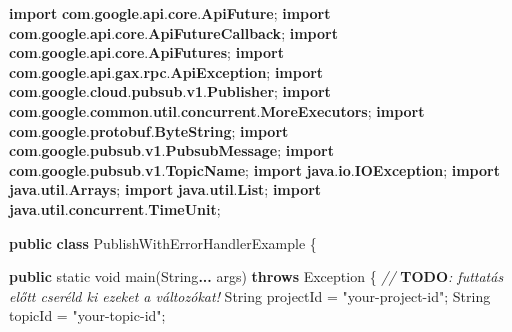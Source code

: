\documentclass[
]{article}
\newenvironment{Shaded}{}{}
\newcommand{\AlertTok}[1]{\textcolor[rgb]{1.00,0.00,0.00}{\textbf{#1}}}
\newcommand{\BuiltInTok}[1]{\textcolor[rgb]{0.00,0.50,0.00}{#1}}
\newcommand{\CommentTok}[1]{\textcolor[rgb]{0.38,0.63,0.69}{\textit{#1}}}
\newcommand{\DataTypeTok}[1]{\textcolor[rgb]{0.56,0.13,0.00}{#1}}
\newcommand{\FunctionTok}[1]{\textcolor[rgb]{0.02,0.16,0.49}{#1}}
\newcommand{\ImportTok}[1]{\textcolor[rgb]{0.00,0.50,0.00}{\textbf{#1}}}
\newcommand{\KeywordTok}[1]{\textcolor[rgb]{0.00,0.44,0.13}{\textbf{#1}}}
\newcommand{\NormalTok}[1]{#1}
\newcommand{\OperatorTok}[1]{\textcolor[rgb]{0.40,0.40,0.40}{#1}}
\newcommand{\StringTok}[1]{\textcolor[rgb]{0.25,0.44,0.63}{#1}}
\begin{document}
\begin{Shaded}
\begin{Highlighting}[]
\KeywordTok{import} \ImportTok{com}\OperatorTok{.}\ImportTok{google}\OperatorTok{.}\ImportTok{api}\OperatorTok{.}\ImportTok{core}\OperatorTok{.}\ImportTok{ApiFuture}\OperatorTok{;}
\KeywordTok{import} \ImportTok{com}\OperatorTok{.}\ImportTok{google}\OperatorTok{.}\ImportTok{api}\OperatorTok{.}\ImportTok{core}\OperatorTok{.}\ImportTok{ApiFutureCallback}\OperatorTok{;}
\KeywordTok{import} \ImportTok{com}\OperatorTok{.}\ImportTok{google}\OperatorTok{.}\ImportTok{api}\OperatorTok{.}\ImportTok{core}\OperatorTok{.}\ImportTok{ApiFutures}\OperatorTok{;}
\KeywordTok{import} \ImportTok{com}\OperatorTok{.}\ImportTok{google}\OperatorTok{.}\ImportTok{api}\OperatorTok{.}\ImportTok{gax}\OperatorTok{.}\ImportTok{rpc}\OperatorTok{.}\ImportTok{ApiException}\OperatorTok{;}
\KeywordTok{import} \ImportTok{com}\OperatorTok{.}\ImportTok{google}\OperatorTok{.}\ImportTok{cloud}\OperatorTok{.}\ImportTok{pubsub}\OperatorTok{.}\ImportTok{v1}\OperatorTok{.}\ImportTok{Publisher}\OperatorTok{;}
\KeywordTok{import} \ImportTok{com}\OperatorTok{.}\ImportTok{google}\OperatorTok{.}\ImportTok{common}\OperatorTok{.}\ImportTok{util}\OperatorTok{.}\ImportTok{concurrent}\OperatorTok{.}\ImportTok{MoreExecutors}\OperatorTok{;}
\KeywordTok{import} \ImportTok{com}\OperatorTok{.}\ImportTok{google}\OperatorTok{.}\ImportTok{protobuf}\OperatorTok{.}\ImportTok{ByteString}\OperatorTok{;}
\KeywordTok{import} \ImportTok{com}\OperatorTok{.}\ImportTok{google}\OperatorTok{.}\ImportTok{pubsub}\OperatorTok{.}\ImportTok{v1}\OperatorTok{.}\ImportTok{PubsubMessage}\OperatorTok{;}
\KeywordTok{import} \ImportTok{com}\OperatorTok{.}\ImportTok{google}\OperatorTok{.}\ImportTok{pubsub}\OperatorTok{.}\ImportTok{v1}\OperatorTok{.}\ImportTok{TopicName}\OperatorTok{;}
\KeywordTok{import} \ImportTok{java}\OperatorTok{.}\ImportTok{io}\OperatorTok{.}\ImportTok{IOException}\OperatorTok{;}
\KeywordTok{import} \ImportTok{java}\OperatorTok{.}\ImportTok{util}\OperatorTok{.}\ImportTok{Arrays}\OperatorTok{;}
\KeywordTok{import} \ImportTok{java}\OperatorTok{.}\ImportTok{util}\OperatorTok{.}\ImportTok{List}\OperatorTok{;}
\KeywordTok{import} \ImportTok{java}\OperatorTok{.}\ImportTok{util}\OperatorTok{.}\ImportTok{concurrent}\OperatorTok{.}\ImportTok{TimeUnit}\OperatorTok{;}

\KeywordTok{public} \KeywordTok{class}\NormalTok{ PublishWithErrorHandlerExample }\OperatorTok{\{}

  \KeywordTok{public} \DataTypeTok{static} \DataTypeTok{void} \FunctionTok{main}\OperatorTok{(}\BuiltInTok{String}\KeywordTok{...}\NormalTok{ args}\OperatorTok{)} \KeywordTok{throws} \BuiltInTok{Exception} \OperatorTok{\{}
    \CommentTok{// }\AlertTok{TODO}\CommentTok{: futtatás előtt cseréld ki ezeket a változókat!}
    \BuiltInTok{String}\NormalTok{ projectId }\OperatorTok{=} \StringTok{"your{-}project{-}id"}\OperatorTok{;}
    \BuiltInTok{String}\NormalTok{ topicId }\OperatorTok{=} \StringTok{"your{-}topic{-}id"}\OperatorTok{;}


\end{Highlighting}
\end{Shaded}
\end{document}
